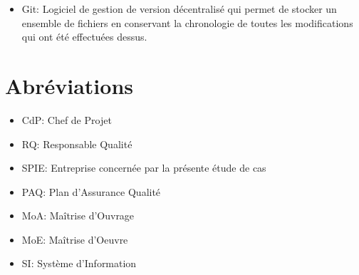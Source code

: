 \begin{itemize}
\item Git: Logiciel de gestion de version décentralisé qui permet de stocker un ensemble de fichiers en conservant la chronologie de toutes les modifications qui ont été effectuées dessus.
\end{itemize}

\section{Abréviations}

\begin{itemize}
\item CdP: Chef de Projet
\item RQ: Responsable Qualité
\item SPIE: Entreprise concernée par la présente étude de cas
\item PAQ: Plan d'Assurance Qualité
\item MoA: Maîtrise d'Ouvrage
\item MoE: Maîtrise d'Oeuvre
\item SI: Système d'Information
\end{itemize}